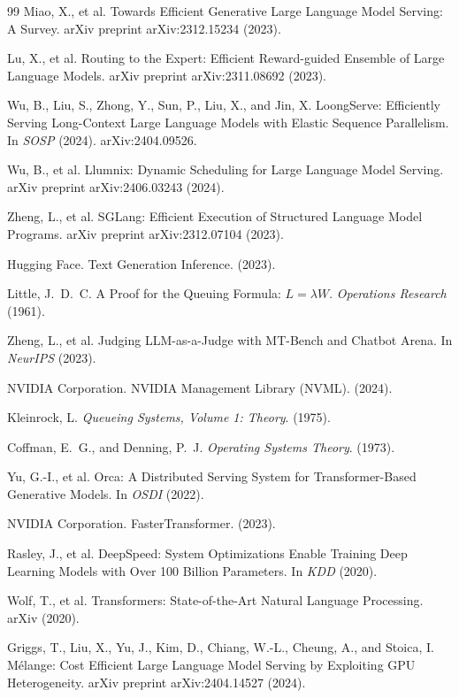 \documentclass[10pt,twocolumn,letterpaper]{article}
\begin{document}
\begin{thebibliography}{99}
Miao, X., et al.
Towards Efficient Generative Large Language Model Serving: A Survey.
arXiv preprint arXiv:2312.15234 (2023).

Lu, X., et al.
Routing to the Expert: Efficient Reward-guided Ensemble of Large Language Models.
arXiv preprint arXiv:2311.08692 (2023).

Wu, B., Liu, S., Zhong, Y., Sun, P., Liu, X., and Jin, X.
LoongServe: Efficiently Serving Long-Context Large Language Models with Elastic Sequence Parallelism.
In \emph{SOSP} (2024). arXiv:2404.09526.

Wu, B., et al.
Llumnix: Dynamic Scheduling for Large Language Model Serving.
arXiv preprint arXiv:2406.03243 (2024).

Zheng, L., et al.
SGLang: Efficient Execution of Structured Language Model Programs.
arXiv preprint arXiv:2312.07104 (2023).

Hugging Face.
Text Generation Inference.
(2023).

Little, J.~D.~C.
A Proof for the Queuing Formula: $L = \lambda W$.
\emph{Operations Research} (1961).

Zheng, L., et al.
Judging LLM-as-a-Judge with MT-Bench and Chatbot Arena.
In \emph{NeurIPS} (2023).

NVIDIA Corporation.
NVIDIA Management Library (NVML).
(2024).

Kleinrock, L.
\emph{Queueing Systems, Volume 1: Theory}.
(1975).

Coffman, E.~G., and Denning, P.~J.
\emph{Operating Systems Theory}.
(1973).

Yu, G.-I., et al.
Orca: A Distributed Serving System for Transformer-Based Generative Models.
In \emph{OSDI} (2022).

NVIDIA Corporation.
FasterTransformer.
(2023).

Rasley, J., et al.
DeepSpeed: System Optimizations Enable Training Deep Learning Models with Over 100 Billion Parameters.
In \emph{KDD} (2020).

Wolf, T., et al.
Transformers: State-of-the-Art Natural Language Processing.
arXiv (2020).

Griggs, T., Liu, X., Yu, J., Kim, D., Chiang, W.-L., Cheung, A., and Stoica, I.
M\'elange: Cost Efficient Large Language Model Serving by Exploiting GPU Heterogeneity.
arXiv preprint arXiv:2404.14527 (2024).


\end{thebibliography}
\end{document}
